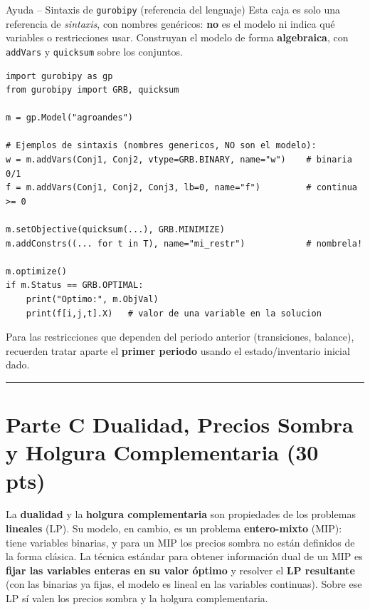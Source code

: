 \documentclass[12pt,a4paper]{article}
\begin{document}
\begin{ayuda}{Ayuda -- Sintaxis de \texttt{gurobipy} (referencia del lenguaje)}
\vspace{2pt}
Esta caja es solo una referencia de \emph{sintaxis}, con nombres genéricos:
\textbf{no} es el modelo ni indica qué variables o restricciones usar. Construyan
el modelo de forma \textbf{algebraica}, con \texttt{addVars} y \texttt{quicksum}
sobre los conjuntos.
\begin{lstlisting}
import gurobipy as gp
from gurobipy import GRB, quicksum

m = gp.Model("agroandes")

# Ejemplos de sintaxis (nombres genericos, NO son el modelo):
w = m.addVars(Conj1, Conj2, vtype=GRB.BINARY, name="w")    # binaria 0/1
f = m.addVars(Conj1, Conj2, Conj3, lb=0, name="f")         # continua >= 0

m.setObjective(quicksum(...), GRB.MINIMIZE)
m.addConstrs((... for t in T), name="mi_restr")            # nombrela!

m.optimize()
if m.Status == GRB.OPTIMAL:
    print("Optimo:", m.ObjVal)
    print(f[i,j,t].X)   # valor de una variable en la solucion
\end{lstlisting}
Para las restricciones que dependen del periodo anterior (transiciones, balance),
recuerden tratar aparte el \textbf{primer periodo} usando el estado/inventario
inicial dado.
\end{ayuda}

\noindent\rule{\linewidth}{0.4pt}
\newpage
\section*{Parte C \quad Dualidad, Precios Sombra y Holgura Complementaria \hfill\normalfont\normalsize(30 pts)}

La \textbf{dualidad} y la \textbf{holgura complementaria} son propiedades de los
problemas \textbf{lineales} (LP). Su modelo, en cambio, es un problema
\textbf{entero-mixto} (MIP): tiene variables binarias, y para un MIP los precios
sombra no están definidos de la forma clásica. La técnica estándar para obtener
información dual de un MIP es \textbf{fijar las variables enteras en su valor
óptimo} y resolver el \textbf{LP resultante} (con las binarias ya fijas, el modelo
es lineal en las variables continuas). Sobre ese LP sí valen los precios sombra y
la holgura complementaria.
\end{document}
